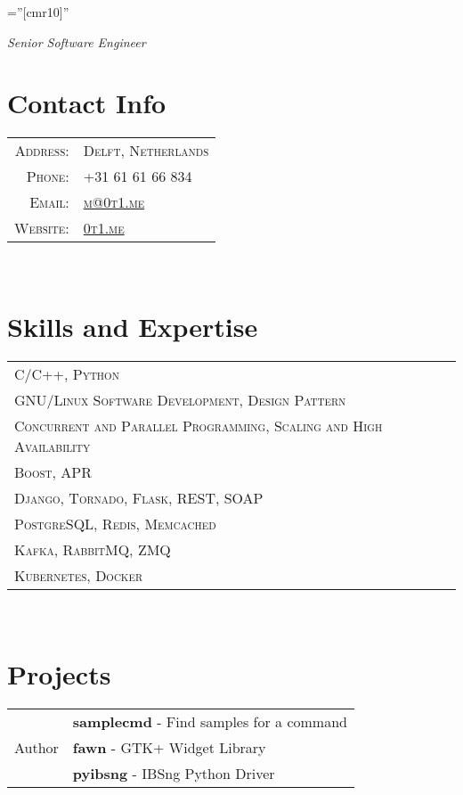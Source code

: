 \documentclass[a4paper,11pt]{article}
\begin{document}
\pagestyle{empty}    %
\font\fb=''[cmr10]'' %

\par {\bigskip \emph{Senior Software Engineer} \par}

\section{Contact Info}
\begin{tabular}{rl}

    \textsc{Address:}     & \textsc{Delft, Netherlands}\\
    \textsc{Phone:}       & \textsc{+31 61 61 66 834}\\
    \textsc{Email:}       & \textsc{\href{mailto:m@0t1.me}{m@0t1.me}}\\
    \textsc{Website:}     & \textsc{\href{https://0t1.me/}{0t1.me}}\\

\end{tabular}\\

\section{Skills and Expertise}
\begin{tabular}{lr}

    \textsc{C/C++, Python}\\
    \textsc{GNU/Linux Software Development, Design Pattern}\\
    \textsc{Concurrent and Parallel Programming, Scaling and High Availability}\\
    \textsc{Boost, APR}\\
    \textsc{Django, Tornado, Flask, REST, SOAP}\\
    \textsc{PostgreSQL, Redis, Memcached}\\
    \textsc{Kafka, RabbitMQ, ZMQ}\\
    \textsc{Kubernetes, Docker}\\

\end{tabular}\\

\section{Projects}
\begin{tabular}{r|p{11cm}}

    \multirow{3}{*}{\hspace{2.75cm}Author}
    & \textbf{samplecmd} - Find samples for a command\\
    & \textbf{fawn} - GTK+ Widget Library\\
    & \textbf{pyibsng} - IBSng Python Driver\\

\end{tabular}\\
\end{document}

